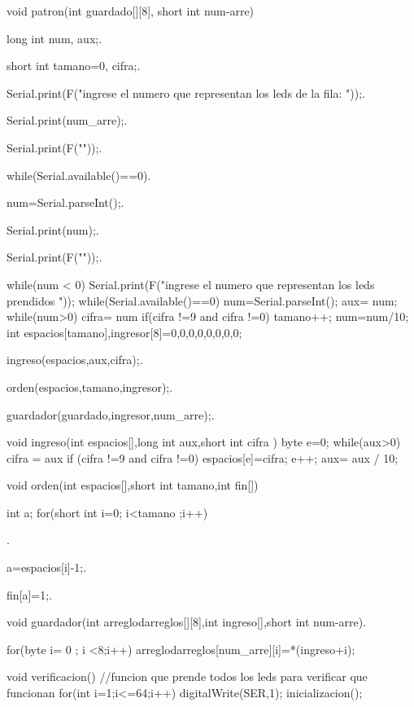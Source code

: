 \documentclass{article}
\begin{document}
void patron(int guardado[][8], short int num-arre)
{	
  	long int num, aux;.
  	
    short int tamano=0, cifra;.
    
  	Serial.print(F("ingrese el numero que representan los leds de la fila: "));.
  	
  	Serial.print(num_arre);.
  	
    Serial.print(F("\n"));.
    
    while(Serial.available()==0){}.
    
  	num=Serial.parseInt();.
  	
  	Serial.print(num);.
  	
    Serial.print(F("\n"));.
    
    while(num < 0)
    {
    Serial.print(F("ingrese el numero que representan los leds prendidos \n"));
    while(Serial.available()==0){}
  	num=Serial.parseInt(); 
    }
  	aux= num;
  	while(num>0)
    {
      cifra= num %
      if(cifra !=9 and cifra !=0)
      {
        tamano++;
      }
      num=num/10;
    }
  int espacios[tamano],ingresor[8]={0,0,0,0,0,0,0,0};

  	ingreso(espacios,aux,cifra);.
  	
  	orden(espacios,tamano,ingresor);.
  	
  	guardador(guardado,ingresor,num_arre);.
  	
}

void ingreso(int espacios[],long int aux,short int cifra )
{	byte e=0;  
  	while(aux>0)
    {
      cifra = aux %
      if (cifra !=9 and cifra !=0)
      {
        espacios[e]=cifra;
      	e++;
      }
      aux= aux / 10;
    }  
}


void orden(int espacios[],short int tamano,int fin[])
{ 
  int a;
	for(short int i=0; i<tamano ;i++){.
	
      a=espacios[i]-1;.
      
      fin[a]=1;.
    }  
}

void guardador(int arreglodarreglos[][8],int ingreso[],short int num-arre).

{
	for(byte i= 0 ; i <8;i++)
    {
      arreglodarreglos[num_arre][i]=*(ingreso+i);
    }	
}

void verificacion()
{//funcion que prende todos los leds para verificar que funcionan 
  for(int i=1;i<=64;i++)
  {
    digitalWrite(SER,1);
    inicializacion();  	 
  } 
}
\end{document}
